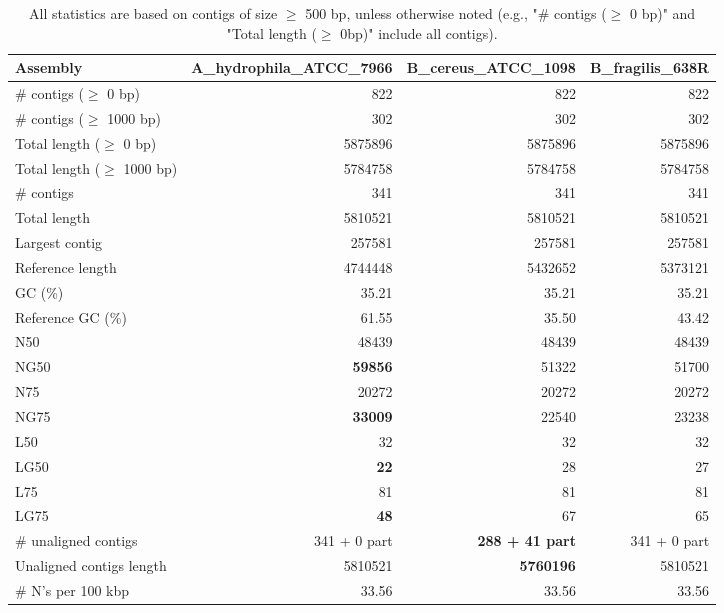 \documentclass[12pt,a4paper]{article}
\begin{document}
\begin{table}[ht]
\begin{center}
\caption{All statistics are based on contigs of size $\geq$ 500 bp, unless otherwise noted (e.g., "\# contigs ($\geq$ 0 bp)" and "Total length ($\geq$ 0bp)" include all contigs).}
\begin{tabular}{|l*{3}{|r}|}
\hline
Assembly & A\_hydrophila\_ATCC\_7966 & B\_cereus\_ATCC\_1098 & B\_fragilis\_638R \\ \hline
\# contigs ($\geq$ 0 bp) & 822 & 822 & 822 \\ \hline
\# contigs ($\geq$ 1000 bp) & 302 & 302 & 302 \\ \hline
Total length ($\geq$ 0 bp) & 5875896 & 5875896 & 5875896 \\ \hline
Total length ($\geq$ 1000 bp) & 5784758 & 5784758 & 5784758 \\ \hline
\# contigs & 341 & 341 & 341 \\ \hline
Total length & 5810521 & 5810521 & 5810521 \\ \hline
Largest contig & 257581 & 257581 & 257581 \\ \hline
Reference length & 4744448 & 5432652 & 5373121 \\ \hline
GC (\%) & 35.21 & 35.21 & 35.21 \\ \hline
Reference GC (\%) & 61.55 & 35.50 & 43.42 \\ \hline
N50 & 48439 & 48439 & 48439 \\ \hline
NG50 & {\bf 59856} & 51322 & 51700 \\ \hline
N75 & 20272 & 20272 & 20272 \\ \hline
NG75 & {\bf 33009} & 22540 & 23238 \\ \hline
L50 & 32 & 32 & 32 \\ \hline
LG50 & {\bf 22} & 28 & 27 \\ \hline
L75 & 81 & 81 & 81 \\ \hline
LG75 & {\bf 48} & 67 & 65 \\ \hline
\# unaligned contigs & 341 + 0 part & {\bf 288 + 41 part} & 341 + 0 part \\ \hline
Unaligned contigs length & 5810521 & {\bf 5760196} & 5810521 \\ \hline
\# N's per 100 kbp & 33.56 & 33.56 & 33.56 \\ \hline
\end{tabular}
\end{center}
\end{table}
\end{document}
